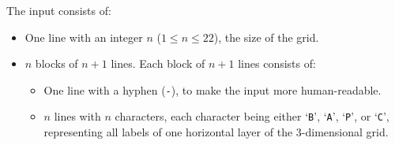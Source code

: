 
    The input consists of:
    \begin{itemize}
        \item One line with an integer $n$ ($1\leq n\leq 22$), the size of the grid.
        \item $n$ blocks of $n+1$ lines. Each block of $n+1$ lines consists of:
        \begin{itemize}
            \item One line with a hyphen (\texttt{-}), to make the input more human-readable.
            \item $n$ lines with $n$ characters, each character being either `\texttt{B}', `\texttt{A}', `\texttt{P}', or `\texttt{C}', \\
                representing all labels of one horizontal layer of the $3$-dimensional  grid.
        \end{itemize}
    \end{itemize}
